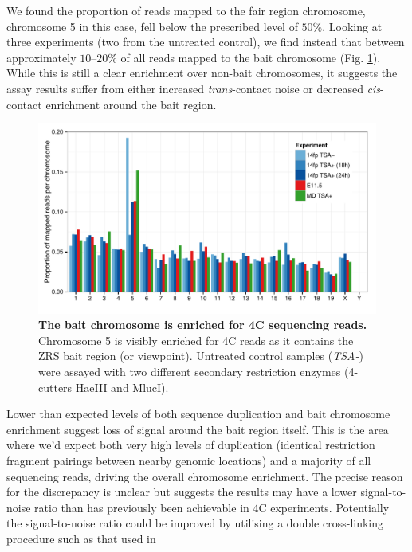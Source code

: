 \documentclass[a4paper,11pt,oneside]{book}
\begin{document}
We found the proportion of reads mapped to the fair region chromosome, chromosome 5 in this case, fell below the prescribed level of $50\%$. Looking at three experiments (two from the untreated control), we find instead that between approximately $10$--$20\%$ of all reads mapped to the bait chromosome (Fig. \ref{fig:4cchromosomes}). While this is still a clear enrichment over non-bait chromosomes, it suggests the assay results suffer from either increased \emph{trans}-contact noise or decreased \emph{cis}-contact enrichment around the bait region. 

\begin{figure}
\begin{center} 
\includegraphics[width=5.4in]{figs/4c_chromosomes_v2.pdf}
\captionsetup{width=\textwidth} 
\caption[ The bait chromosome is enriched for 4C sequencing reads. ]{ {\bf The bait chromosome is enriched for 4C sequencing reads. }
Chromosome 5 is visibly enriched for 4C reads as it  contains the ZRS bait region (or viewpoint). Untreated control samples (\emph{TSA-}) were assayed with two different secondary restriction enzymes (4-cutters HaeIII and MlucI).
}\label{fig:4cchromosomes}
\end{center} 
\end{figure} 

Lower than expected levels of both sequence duplication and bait chromosome enrichment suggest loss of signal around the bait region itself. This is the area where we'd expect both very high levels of duplication (identical restriction fragment pairings between nearby genomic locations) and a majority of all sequencing reads, driving the overall chromosome enrichment. The precise reason for the discrepancy is unclear but suggests the results may have a lower signal-to-noise ratio than has previously been achievable in 4C experiments.\cite{Stadhouders2013} Potentially the signal-to-noise ratio could be improved by utilising a double cross-linking procedure such as that used in \citet{Lin2012}
\end{document}
